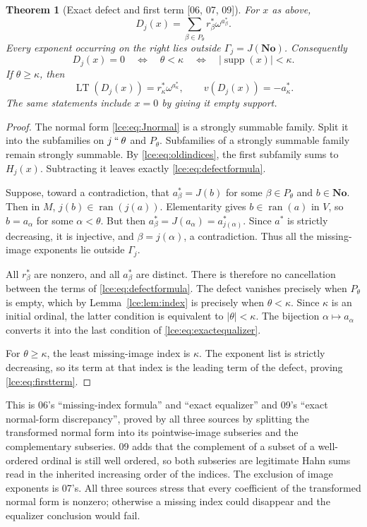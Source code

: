 \documentclass[11pt,letterpaper]{article}
\numberwithin{equation}{section}
\newtheorem{theorem}{Theorem}[section]
\theoremstyle{definition}
\theoremstyle{remark}
\newcommand{\No}{\mathbf{No}}
\newcommand{\supp}{\operatorname{supp}}
\newcommand{\ran}{\operatorname{ran}}
\newcommand{\LT}{\operatorname{LT}}
\newcommand{\Gam}{\Gamma_j}
\newcommand{\imset}[2]{#1\mathbin{``}#2}
\newcommand{\abs}[1]{\lvert#1\rvert}
\newcommand{\leref}[1]{Lemma~\ref{#1}}
\newcommand{\src}[1]{\textup{\textsf{\small[#1]}}}%
\begin{document}
\begin{theorem}[Exact defect and first term \src{06, 07, 09}]\label{lce:thm:defect}
For $x$ as above,
\begin{equation}\label{lce:eq:defectformula}
 D_j(x)=\sum_{\beta\in P_\theta}r^*_\beta\omega^{a^*_\beta}.
\end{equation}
Every exponent occurring on the right lies outside $\Gam=J(\No)$.
Consequently
\begin{equation}\label{lce:eq:exactequalizer}
 D_j(x)=0\quad\Longleftrightarrow\quad\theta<\kappa
 \quad\Longleftrightarrow\quad\abs{\supp(x)}<\kappa.
\end{equation}
If $\theta\ge\kappa$, then
\begin{equation}\label{lce:eq:firstterm}
 \LT(D_j(x))=r^*_{\kappa}\omega^{a^*_{\kappa}},\qquad
 v(D_j(x))=-a^*_{\kappa}.
\end{equation}
The same statements include $x=0$ by giving it empty support.
\end{theorem}
\begin{proof}
The normal form \eqref{lce:eq:Jnormal} is a strongly summable family. Split it
into the subfamilies on $\imset j\theta$ and $P_\theta$. Subfamilies of a
strongly summable family remain strongly summable. By
\eqref{lce:eq:oldindices}, the first subfamily sums to $H_j(x)$.
Subtracting it leaves exactly \eqref{lce:eq:defectformula}.

Suppose, toward a contradiction, that $a^*_\beta=J(b)$ for some
$\beta\in P_\theta$ and $b\in\No$. Then in $M$,
$j(b)\in\ran(j(a))$. Elementarity gives $b\in\ran(a)$ in $V$, so
$b=a_\alpha$ for some $\alpha<\theta$. But then
$a^*_\beta=J(a_\alpha)=a^*_{j(\alpha)}$. Since $a^*$ is strictly decreasing,
it is injective, and $\beta=j(\alpha)$, a contradiction. Thus all the
missing-image exponents lie outside $\Gam$.

All $r^*_\beta$ are nonzero, and all $a^*_\beta$ are distinct. There is
therefore no cancellation between the terms of \eqref{lce:eq:defectformula}.
The defect vanishes precisely when $P_\theta$ is empty, which by
\leref{lce:lem:index} is precisely when $\theta<\kappa$.
Since $\kappa$ is an initial ordinal, the latter condition is equivalent to
$\abs\theta<\kappa$. The bijection $\alpha\mapsto a_\alpha$ converts it
into the last condition of \eqref{lce:eq:exactequalizer}.

For $\theta\ge\kappa$, the least missing-image index is $\kappa$.
The exponent list is strictly decreasing, so its term at that index is
the leading term of the defect, proving \eqref{lce:eq:firstterm}.
\end{proof}
This is 06's ``missing-index formula'' and ``exact equalizer'' and 09's
``exact normal-form discrepancy'', proved by all three sources by splitting
the transformed normal form into its pointwise-image subseries and the
complementary subseries. 09 adds that the complement of a subset of a
well-ordered ordinal is still well ordered, so both subseries are legitimate
Hahn sums read in the inherited increasing order of the indices. The
exclusion of image exponents is 07's. All three sources stress that every
coefficient of the transformed normal form is nonzero; otherwise a missing
index could disappear and the equalizer conclusion would fail.
\end{document}
